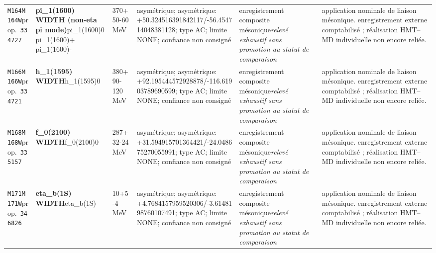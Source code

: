\begin{landscape}
\begin{longtable}{L{1.85cm}L{4.45cm}L{2.35cm}L{4.05cm}L{3.35cm}L{7.15cm}}
\texttt{M164}\newline \texttt{M164W}\newline prop.\ \texttt{334727} & \textbf{pi\_\allowbreak{}1(1600) WIDTH (non-eta pi mode)}\newline pi\_\allowbreak{}1(1600)0 \textbar{}\allowbreak{} pi\_\allowbreak{}1(1600)+ \textbar{}\allowbreak{} pi\_\allowbreak{}1(1600)- & 370+50-60\,MeV & asymétrique; asymétrique: +50.324516391842117/-56.454714048381128; type AC; limite NONE; confiance non consigné & enregistrement composite mésonique\newline \emph{relevé exhaustif sans promotion au statut de comparaison} & application nominale de liaison mésonique. enregistrement externe comptabilisé ; réalisation HMT--MD individuelle non encore reliée. \\
\texttt{M166}\newline \texttt{M166W}\newline prop.\ \texttt{334721} & \textbf{h\_\allowbreak{}1(1595) WIDTH}\newline h\_\allowbreak{}1(1595)0 & 380+90-120\,MeV & asymétrique; asymétrique: +92.195444572928878/-116.61903789690599; type AC; limite NONE; confiance non consigné & enregistrement composite mésonique\newline \emph{relevé exhaustif sans promotion au statut de comparaison} & application nominale de liaison mésonique. enregistrement externe comptabilisé ; réalisation HMT--MD individuelle non encore reliée. \\
\texttt{M168}\newline \texttt{M168W}\newline prop.\ \texttt{335157} & \textbf{f\_\allowbreak{}0(2100) WIDTH}\newline f\_\allowbreak{}0(2100)0 & 287+32-24\,MeV & asymétrique; asymétrique: +31.594915701364421/-24.048675270055991; type AC; limite NONE; confiance non consigné & enregistrement composite mésonique\newline \emph{relevé exhaustif sans promotion au statut de comparaison} & application nominale de liaison mésonique. enregistrement externe comptabilisé ; réalisation HMT--MD individuelle non encore reliée. \\
\texttt{M171}\newline \texttt{M171W}\newline prop.\ \texttt{346826} & \textbf{eta\_\allowbreak{}b(1S) WIDTH}\newline eta\_\allowbreak{}b(1S) & 10+5-4\,MeV & asymétrique; asymétrique: +4.7684157959520306/-3.6148198760107491; type AC; limite NONE; confiance non consigné & enregistrement composite mésonique\newline \emph{relevé exhaustif sans promotion au statut de comparaison} & application nominale de liaison mésonique. enregistrement externe comptabilisé ; réalisation HMT--MD individuelle non encore reliée. \\

\end{longtable}
\end{landscape}
